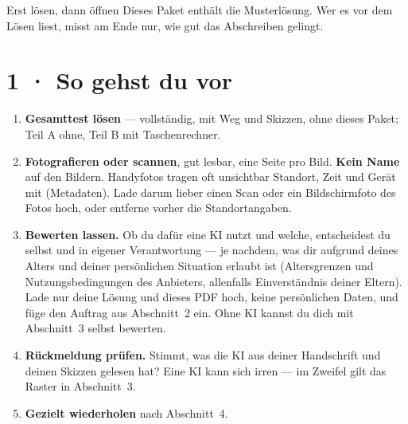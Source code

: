 \documentclass[11pt]{article}
\begin{document}

\begin{lpachtung}{Erst lösen, dann öffnen}
Dieses Paket enthält die Musterlösung. Wer es vor dem Lösen liest, misst am Ende nur, wie gut das Abschreiben gelingt.
\end{lpachtung}

\section*{1 · So gehst du vor}
\begin{enumerate}[leftmargin=*,itemsep=2pt]
\item \textbf{Gesamttest lösen} — vollständig, mit Weg und Skizzen, ohne dieses Paket; Teil A ohne, Teil B mit Taschenrechner.
\item \textbf{Fotografieren oder scannen}, gut lesbar, eine Seite pro Bild. \textbf{Kein Name} auf den Bildern.
  Handyfotos tragen oft unsichtbar Standort, Zeit und Gerät mit (Metadaten). Lade darum lieber einen Scan oder ein
  Bildschirmfoto des Fotos hoch, oder entferne vorher die Standortangaben.
\item \textbf{Bewerten lassen.} Ob du dafür eine KI nutzt und welche, entscheidest du selbst und in eigener Verantwortung —
  je nachdem, was dir aufgrund deines Alters und deiner persönlichen Situation erlaubt ist (Altersgrenzen und
  Nutzungsbedingungen des Anbieters, allenfalls Einverständnis deiner Eltern). Lade nur deine Lösung und dieses PDF hoch,
  keine persönlichen Daten, und füge den Auftrag aus Abschnitt~2 ein. Ohne KI kannst du dich mit Abschnitt~3 selbst bewerten.
\item \textbf{Rückmeldung prüfen.} Stimmt, was die KI aus deiner Handschrift und deinen Skizzen gelesen hat? Eine KI kann sich
  irren — im Zweifel gilt das Raster in Abschnitt~3.
\item \textbf{Gezielt wiederholen} nach Abschnitt~4.
\end{enumerate}

\end{document}
